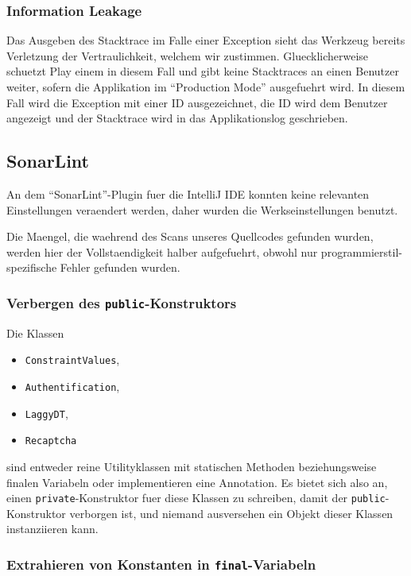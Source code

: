 \documentclass[12pt,DIV14,BCOR10mm,a4paper,twoside,parskip=half-,headsepline,headinclude,english,ngerman,bibliography=totocnumbered]{scrreprt}
\begin{document}
\subsubsection{Information Leakage}

Das Ausgeben des Stacktrace im Falle einer Exception sieht das Werkzeug bereits Verletzung der Vertraulichkeit, welchem wir zustimmen.
Gluecklicherweise schuetzt Play einem in diesem Fall und gibt keine Stacktraces an einen Benutzer weiter, sofern die Applikation im \enquote{Production Mode} ausgefuehrt wird.
In diesem Fall wird die Exception mit einer ID ausgezeichnet, die ID wird dem Benutzer angezeigt und der Stacktrace wird in das Applikationslog geschrieben.

\subsection{SonarLint}

An dem \enquote{SonarLint}-Plugin fuer die IntelliJ IDE konnten keine relevanten Einstellungen veraendert werden, daher wurden die Werkseinstellungen benutzt.

Die Maengel, die waehrend des Scans unseres Quellcodes gefunden wurden, werden hier der Vollstaendigkeit halber aufgefuehrt, obwohl nur programmierstil-spezifische Fehler gefunden wurden.

\subsubsection{Verbergen des \texttt{public}-Konstruktors}

Die Klassen

\begin{itemize}
  \item \texttt{ConstraintValues},
  \item \texttt{Authentification},
  \item \texttt{LaggyDT},
  \item \texttt{Recaptcha}
\end{itemize}

sind entweder reine Utilityklassen mit statischen Methoden beziehungsweise finalen Variabeln oder implementieren eine Annotation.
Es bietet sich also an, einen \texttt{private}-Konstruktor fuer diese Klassen zu schreiben, damit der \texttt{public}-Konstruktor verborgen ist, und niemand ausversehen ein Objekt dieser Klassen instanziieren kann.

\subsubsection{Extrahieren von Konstanten in \texttt{final}-Variabeln}
\end{document}
